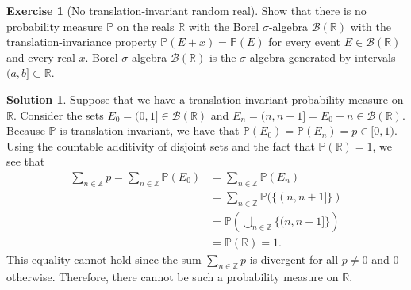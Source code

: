 \documentclass[12pt]{article}
\newcommand{\bbR}{\mathbb{R}}
\newcommand{\bbZ}{\mathbb{Z}}
\newcommand{\Prob}{\mathbb{P}}
\theoremstyle{definition}
\newtheorem{exer}{Exercise}
\newtheorem{sol}{Solution}
\theoremstyle{remark}
\begin{document}
\newpage
\begin{exer}[No translation-invariant random real]
 Show that there is no probability measure $\Prob$ on the reals $\mathbb{R}$ with the Borel
$\sigma$-algebra $\mathcal{B}(\mathbb{R})$ with the translation-invariance property $\Prob(E + x) = \Prob(E)$ for every event $E \in \mathcal{B}(\mathbb{R})$ and every real $x$. Borel $\sigma$-algebra $\mathcal{B}(\mathbb{R})$ is the $\sigma$-algebra generated by intervals $(a,b] \subset \mathbb{R}$.
\end{exer}
\begin{sol}
    Suppose that we have a translation invariant probability measure on $\bbR$. Consider the sets $E_0 = (0,1] \in \mathcal{B}(\bbR)$ and $E_n = (n, n+1] = E_0 + n \in \mathcal{B}(\bbR)$. Because $\Prob$ is translation invariant, we have that $\Prob(E_0) = \Prob(E_n) = p \in [0,1)$. Using the countable additivity of disjoint sets and the fact that $\Prob(\bbR) = 1$, we see that
    \begin{align}
        \sum_{n\in\bbZ} p = \sum_{n\in\bbZ} \Prob(E_0) &= \sum_{n\in\bbZ} \Prob(E_n)\\
                                                       &= \sum_{n\in\bbZ} \Prob(\{(n, n+1] \})\\
                                                       &= \Prob \left( \bigcup_{n\in\bbZ} \{ (n, n+1]\}\right)\\
                                                       &= \Prob(\bbR) = 1.
    \end{align}
    This equality cannot hold since the sum $\sum_{n\in\bbZ} p$ is divergent for all $p\neq 0$ and 0 otherwise. Therefore, there cannot be such a probability measure on $\bbR$.
\end{sol}
\end{document}
